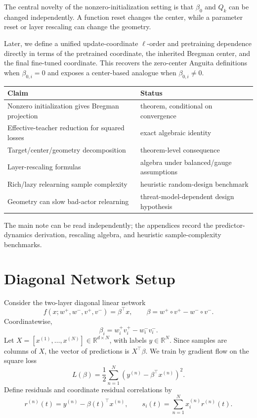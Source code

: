 \documentclass[11pt]{article}
\begin{document}
The central novelty of the nonzero-initialization setting is that \(\beta_0\) and \(Q_k\) can be changed independently. A function reset changes the center, while a parameter reset or layer rescaling can change the geometry.

Later, we define a unified update-coordinate \(\ell\)-order and pretraining dependence directly in terms of the pretrained coordinate, the inherited Bregman center, and the final fine-tuned coordinate. This recovers the zero-center Anguita definitions when \(\beta_{0,i}=0\) and exposes a center-based analogue when \(\beta_{0,i}\neq0\).

\begin{center}
\begin{tabular}{ll}
\toprule
\textbf{Claim} & \textbf{Status} \\
\midrule
Nonzero initialization gives Bregman projection & theorem, conditional on convergence \\
Effective-teacher reduction for squared losses & exact algebraic identity \\
Target/center/geometry decomposition & theorem-level consequence \\
Layer-rescaling formulas & algebra under balanced/gauge assumptions \\
Rich/lazy relearning sample complexity & heuristic random-design benchmark \\
Geometry can slow bad-actor relearning & threat-model-dependent design hypothesis \\
\bottomrule
\end{tabular}
\end{center}
The main note can be read independently; the appendices record the predictor-dynamics derivation, rescaling algebra, and heuristic sample-complexity benchmarks.

\section{Diagonal Network Setup}

Consider the two-layer diagonal linear network
\begin{equation}
    f(x;w^+,w^-,v^+,v^-)=\beta^\top x,
    \qquad
    \beta=w^+\circ v^+ - w^-\circ v^- .
\end{equation}
Coordinatewise,
\begin{equation}
    \beta_i=w_i^+v_i^+ - w_i^-v_i^- .
\end{equation}
Let \(X=[x^{(1)},\ldots,x^{(N)}]\in\mathbb R^{d\times N}\), with labels \(y\in\mathbb R^N\). Since samples are columns of \(X\), the vector of predictions is \(X^\top\beta\). We train by gradient flow on the square loss
\begin{equation}
    L(\beta)
    =
    \frac12\sum_{n=1}^N
    \left(y^{(n)}-\beta^\top x^{(n)}\right)^2 .
\end{equation}
Define residuals and coordinate residual correlations by
\begin{equation}
    r^{(n)}(t)=y^{(n)}-\beta(t)^\top x^{(n)},
    \qquad
    s_i(t)=\sum_{n=1}^N x_i^{(n)}r^{(n)}(t).
\end{equation}
\end{document}
